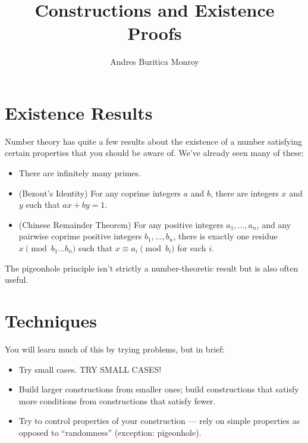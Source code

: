 \documentclass{article}
\title{Constructions and Existence Proofs}
\author{Andres Buritica Monroy}
\date{}
\begin{document}
\maketitle
\section{Existence Results}
Number theory has quite a few results about the existence of a number satisfying
certain properties that you should be aware of. We've already seen many of
these:
\begin{itemize}
	\item There are infinitely many primes.
	\item (Bezout's Identity)
	      For any coprime integers $a$ and $b$, there are integers $x$ and $y$ such
	      that $ax+by=1$.
	\item (Chinese Remainder Theorem)
	      For any positive integers $a_1,\ldots,a_n$, and any pairwise coprime positive
	      integers $b_1,\ldots,b_n$, there is exactly one residue $x\pmod {b_1\ldots
			      b_n}$ such that $x\equiv a_i\pmod{b_i}$ for each $i$.
\end{itemize}
The pigeonhole principle isn't strictly a number-theoretic result but is also
often useful.
\section{Techniques}
You will learn much of this by trying problems, but in brief:
\begin{itemize}
	\item Try small cases. TRY SMALL CASES!\@
	\item Build larger constructions from smaller ones; build constructions that
	      satisfy more conditions from constructions that satisfy fewer.
	\item Try to control properties of your construction --- rely on simple
	      properties as opposed to ``randomness'' (exception: pigeonhole).
\end{itemize}
\newpage
\end{document}
